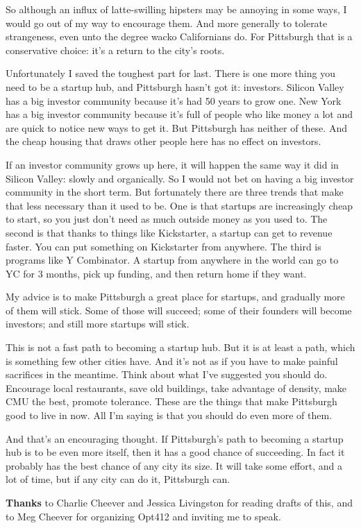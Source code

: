 So although an influx of latte-swilling hipsters may be annoying in some
ways, I would go out of my way to encourage them. And more generally to
tolerate strangeness, even unto the degree wacko Californians do. For
Pittsburgh that is a conservative choice: it's a return to the city's
roots.

Unfortunately I saved the toughest part for last. There is one more
thing you need to be a startup hub, and Pittsburgh hasn't got it:
investors. Silicon Valley has a big investor community because it's had
50 years to grow one. New York has a big investor community because it's
full of people who like money a lot and are quick to notice new ways to
get it. But Pittsburgh has neither of these. And the cheap housing that
draws other people here has no effect on investors.

If an investor community grows up here, it will happen the same way it
did in Silicon Valley: slowly and organically. So I would not bet on
having a big investor community in the short term. But fortunately there
are three trends that make that less necessary than it used to be. One
is that startups are increasingly cheap to start, so you just don't need
as much outside money as you used to. The second is that thanks to
things like Kickstarter, a startup can get to revenue faster. You can
put something on Kickstarter from anywhere. The third is programs like Y
Combinator. A startup from anywhere in the world can go to YC for 3
months, pick up funding, and then return home if they want.

My advice is to make Pittsburgh a great place for startups, and
gradually more of them will stick. Some of those will succeed; some of
their founders will become investors; and still more startups will
stick.

This is not a fast path to becoming a startup hub. But it is at least a
path, which is something few other cities have. And it's not as if you
have to make painful sacrifices in the meantime. Think about what I've
suggested you should do. Encourage local restaurants, save old
buildings, take advantage of density, make CMU the best, promote
tolerance. These are the things that make Pittsburgh good to live in
now. All I'm saying is that you should do even more of them.

And that's an encouraging thought. If Pittsburgh's path to becoming a
startup hub is to be even more itself, then it has a good chance of
succeeding. In fact it probably has the best chance of any city its
size. It will take some effort, and a lot of time, but if any city can
do it, Pittsburgh can.

\textbf{Thanks} to Charlie Cheever and Jessica Livingston for reading
drafts of this, and to Meg Cheever for organizing Opt412 and inviting me
to speak.